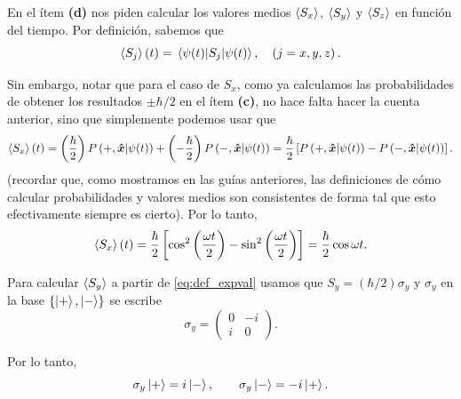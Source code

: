 \documentclass[10pt, a4paper]{article}
\newcommand{\wt}{\omega t}
\numberwithin{equation}{subsection}
\begin{document}
\bigbreak

En el ítem \textbf{(d)} nos piden calcular los valores medios $\expval{S_x}$,
$\expval{S_y}$ y $\expval{S_z}$ en función del tiempo. Por definición, sabemos
que
\begin{equation} \label{eq:def_expval}
  \expval{S_j}(t) = \expval{S_j}{\psi(t)}, \quad\left(j = x,y,z\right).
\end{equation}

Sin embargo, notar que para el caso de $S_x$, como ya calculamos las
probabilidades de obtener los resultados $\pm\hbar/2$ en el ítem \textbf{(c)},
no hace falta hacer la cuenta anterior, sino que simplemente podemos usar que
\begin{equation}
  \expval{S_x}(t) = \left(\frac{\hbar}{2}\right)P\left({+,\vu*{x}}\middle|{\psi(t)}\right)
                 + \left(-\frac{\hbar}{2}\right)P\left({-,\vu*{x}}\middle|{\psi(t)}\right)
                  = \frac{\hbar}{2}\left[P\left({+,\vu*{x}}\middle|{\psi(t)}\right) -
                    P\left({-,\vu*{x}}\middle|{\psi(t)}\right)\right].
\end{equation}
(recordar que, como mostramos en las guías anteriores, las definiciones de cómo
calcular probabilidades y valores medios son consistentes de forma tal que esto
efectivamente siempre es cierto).
Por lo tanto,
\begin{equation} \label{eq:spinevol_expval_sx}
  \expval{S_x}(t) = \frac{\hbar}{2}\left[\cos^2\left(\frac{\wt}{2}\right) -
                    \sin^2\left(\frac{\wt}{2}\right)\right]
                  = \frac{\hbar}{2}\cos\wt.
\end{equation}

Para calcular $\expval{S_y}$ a partir de \eqref{eq:def_expval} usamos que $S_y
= (\hbar/2)\sigma_y$ y $\sigma_y$ en la base $\set{\ket{+}, \ket{-}}$ se
escribe
\begin{equation}
  \sigma_y = \begin{pmatrix} 0 & -i \\ i & 0 \end{pmatrix}.
\end{equation}

Por lo tanto,
\begin{equation}
  \sigma_y\ket{+} = i\ket{-}, \qquad \sigma_y\ket{-} = -i\ket{+}.
\end{equation}
\end{document}
